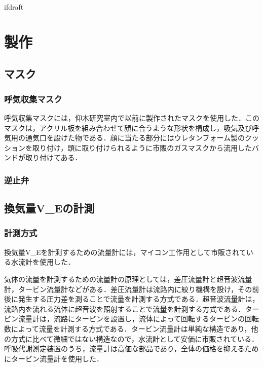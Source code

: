 \expandafter\ifx\csname ifdraft\endcsname\relax
 
\fi

\section{製作}

\subsection{マスク}

\subsubsection{呼気収集マスク}

呼気収集マスクには，仰木研究室内で以前に製作されたマスクを使用した．このマスクは，アクリル板を組み合わせて顔に合うような形状を構成し，吸気及び呼気用の通気口を設けた物である．顔に当たる部分にはウレタンフォーム製のクッションを取り付け，頭に取り付けられるように市販のガスマスクから流用したバンドが取り付けてある．

\subsubsection{逆止弁}

\subsection{換気量V_Eの計測}

\subsubsection{計測方式}

換気量V_Eを計測するための流量計には，マイコン工作用として市販されている水流計を使用した．

気体の流量を計測するための流量計の原理としては，差圧流量計と超音波流量計，タービン流量計などがある．差圧流量計は流路内に絞り機構を設け，その前後に発生する圧力差を測ることで流量を計測する方式である．超音波流量計は，流路内を流れる流体に超音波を照射することで流量を計測する方式である．タービン流量計は，流路にタービンを設置し，流体によって回転するタービンの回転数によって流量を計測する方式である．タービン流量計は単純な構造であり，他の方式に比べて微細ではない構造なので，水流計として安価に市販されている．呼吸代謝測定装置のうち，流量計は高価な部品であり，全体の価格を抑えるためにタービン流量計を使用した．

